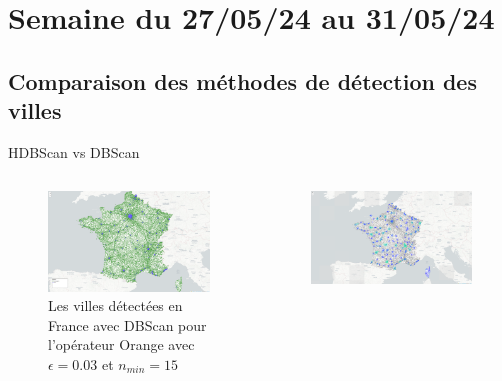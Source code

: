 \smallframetitle

\section{Semaine du 27/05/24 au 31/05/24}
\insertsectionframe

\subsection{Comparaison des méthodes de détection des villes}
\insertsubsectionframe

\begin{frame}{HDBScan vs DBScan}
    \begin{columns}
        \begin{column}{0.5\textwidth}
            \begin{figure}
                \includegraphics[width=0.4\paperwidth]{images/France-Villes-Orange_0.03_15.png}
                \caption{\label{fig:fr-vi-or-0.03-15}Les villes détectées en France avec DBScan pour l'opérateur Orange avec $\epsilon=0.03$ et $n_{min}=15$}
            \end{figure}
        \end{column}
        \begin{column}{0.5\textwidth}
            \begin{figure}
                \includegraphics[width=0.4\paperwidth]{images/villes_HDBSCAN.png}

\end{figure}
\end{column}
\end{columns}
\end{frame}
